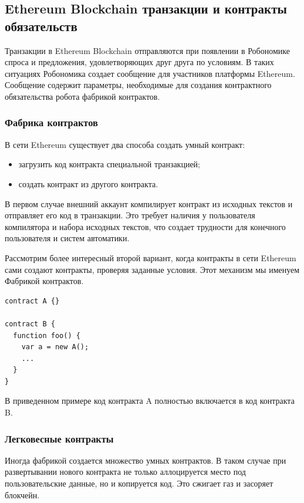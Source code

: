 \documentclass{article}
\begin{document}
\subsection{Ethereum Blockchain транзакции и контракты обязательств}

Транзакции в Ethereum Blockchain отправляются при появлении в Робономике спроса и предложения, удовлетворяющих друг друга по условиям. В таких ситуациях Робономика создает сообщение для участников платформы Ethereum. Сообщение содержит параметры, необходимые для создания контрактного обязательства робота фабрикой контрактов.

\subsubsection{Фабрика контрактов}

В сети Ethereum существует два способа создать умный контракт:
\begin{itemize}[noitemsep]
	\item загрузить код контракта специальной транзакцией;
	\item создать контракт из другого контракта.
\end{itemize}

В первом случае внешний аккаунт компилирует контракт из исходных текстов и отправляет его код в транзакции. Это требует наличия у пользователя компилятора и набора исходных текстов, что создает трудности для конечного пользователя и систем автоматики.

Рассмотрим более интересный второй вариант, когда контракты в сети Ethereum сами создают контракты, проверяя заданные условия. Этот механизм мы именуем Фабрикой контрактов. 

\begin{lstlisting}
contract A {}

contract B {
  function foo() {
    var a = new A();
    ...
  }
}
\end{lstlisting}

В приведенном примере код контракта A полностью включается в код контракта B.

\subsubsection{Легковесные контракты}

Иногда фабрикой создается множество умных контрактов. В таком случае при развертывании нового контракта не только аллоцируется место под пользовательские данные, но и копируется код. Это сжигает газ и засоряет блокчейн.
\end{document}
